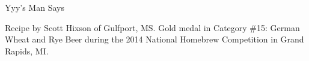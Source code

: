 \documentclass[parskip=half,fontsize=9pt,oneside]{scrbook}
\begin{document}
\mainmatter


\begin{recipe}{Yyy's Man Says}

\begin{aboutblock}
Recipe by Scott Hixson of Gulfport, MS. Gold medal in Category \#15: German Wheat
and Rye Beer during the 2014 National Homebrew Competition in Grand Rapids, MI.
\sourceaha
\end{aboutblock}


\begin{methodandtiming}

\begin{mashsteps}
\end{mashsteps}

\begin{fermentationsteps}
\end{fermentationsteps}

\end{methodandtiming}

\recipebreak

\begin{ingredientsblock}

\begin{malts}
\end{malts}

\begin{hops}
\end{hops}


\end{ingredientsblock}

\end{recipe}


\end{document}
